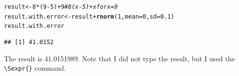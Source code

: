\documentclass{article}\usepackage[]{graphicx}\usepackage[]{xcolor}
\makeatletter
\newcommand{\hlnum}[1]{\textcolor[rgb]{0.686,0.059,0.569}{#1}}%
\newcommand{\hlcom}[1]{\textcolor[rgb]{0.678,0.584,0.686}{\textit{#1}}}%
\newcommand{\hlopt}[1]{\textcolor[rgb]{0,0,0}{#1}}%
\newcommand{\hldef}[1]{\textcolor[rgb]{0.345,0.345,0.345}{#1}}%
\newcommand{\hlkwb}[1]{\textcolor[rgb]{0.69,0.353,0.396}{#1}}%
\newcommand{\hlkwc}[1]{\textcolor[rgb]{0.333,0.667,0.333}{#1}}%
\newcommand{\hlkwd}[1]{\textcolor[rgb]{0.737,0.353,0.396}{\textbf{#1}}}%
\newenvironment{kframe}{%
 \def\at@end@of@kframe{}%
 \ifinner\ifhmode%
  \def\at@end@of@kframe{\end{minipage}}%
  \begin{minipage}{\columnwidth}%
 \fi\fi%
 \def\FrameCommand##1{\hskip\@totalleftmargin \hskip-\fboxsep
 \colorbox{shadecolor}{##1}\hskip-\fboxsep
     \hskip-\linewidth \hskip-\@totalleftmargin \hskip\columnwidth}%
 \MakeFramed {\advance\hsize-\width
   \@totalleftmargin\z@ \linewidth\hsize
   \@setminipage}}%
 {\par\unskip\endMakeFramed%
 \at@end@of@kframe}
\newenvironment{knitrout}{}{} %
\makeatother
\begin{document}
\begin{multicols}{2}
\begin{knitrout}
\color{fgcolor}\begin{kframe}
\begin{alltt}
\hldef{result} \hlkwb{<-} \hlnum{8}\hlopt{*}\hldef{(}\hlnum{9}\hlopt{-}\hlnum{5}\hldef{)} \hlopt{+} \hlnum{9}   \hlcom{# 8(x-5) + x for x = 9}
\hldef{result.with.error} \hlkwb{<-} \hldef{result} \hlopt{+} \hlkwd{rnorm}\hldef{(}\hlnum{1}\hldef{,} \hlkwc{mean} \hldef{=} \hlnum{0}\hldef{,} \hlkwc{sd} \hldef{=} \hlnum{0.1}\hldef{)}
\hldef{result.with.error}
\end{alltt}
\begin{verbatim}
## [1] 41.0152
\end{verbatim}
\end{kframe}
\end{knitrout}
The result is 41.0151989. Note that I did not type the result, but I used the \verb|\Sexpr{}| command.


\end{multicols}
\end{document}
